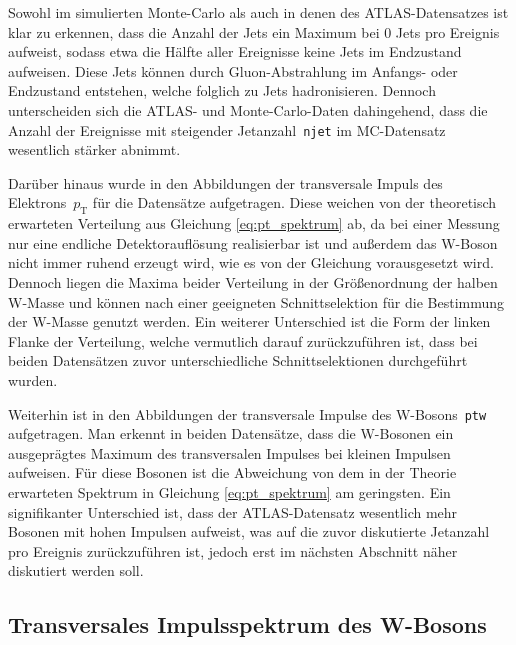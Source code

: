 \documentclass[11pt, a4paper]{article}
\numberwithin{equation}{section}
\begin{document}
Sowohl im simulierten Monte-Carlo als auch in denen des ATLAS-Datensatzes ist klar zu erkennen, dass die Anzahl der Jets ein Maximum bei 0 Jets pro Ereignis aufweist, sodass etwa die Hälfte aller Ereignisse keine Jets im Endzustand aufweisen.
Diese Jets können durch Gluon-Abstrahlung im Anfangs- oder Endzustand entstehen, welche folglich zu Jets hadronisieren.
Dennoch unterscheiden sich die ATLAS- und Monte-Carlo-Daten dahingehend, dass die Anzahl der Ereignisse mit steigender Jetanzahl~\texttt{njet} im MC-Datensatz wesentlich stärker abnimmt.

Darüber hinaus wurde in den Abbildungen der transversale Impuls des Elektrons~$p_\mathrm{T}$ für die Datensätze aufgetragen.
Diese weichen von der theoretisch erwarteten Verteilung aus Gleichung \eqref{eq:pt_spektrum} ab, da bei einer Messung nur eine endliche Detektorauflösung realisierbar ist und außerdem das W-Boson nicht immer ruhend erzeugt wird, wie es von der Gleichung vorausgesetzt wird.
Dennoch liegen die Maxima beider Verteilung in der Größenordnung der halben W-Masse und können nach einer geeigneten Schnittselektion für die Bestimmung der W-Masse genutzt werden.
Ein weiterer Unterschied ist die Form der linken Flanke der Verteilung, welche vermutlich darauf zurückzuführen ist, dass bei beiden Datensätzen zuvor unterschiedliche Schnittselektionen durchgeführt wurden.

Weiterhin ist in den Abbildungen der transversale Impulse des W-Bosons~\texttt{ptw} aufgetragen.
Man erkennt in beiden Datensätze, dass die W-Bosonen ein ausgeprägtes Maximum des transversalen Impulses bei kleinen Impulsen aufweisen.
Für diese Bosonen ist die Abweichung von dem in der Theorie erwarteten Spektrum in Gleichung \eqref{eq:pt_spektrum} am geringsten.
Ein signifikanter Unterschied ist, dass der ATLAS-Datensatz wesentlich mehr Bosonen mit hohen Impulsen aufweist, was auf die zuvor diskutierte Jetanzahl pro Ereignis zurückzuführen ist, jedoch erst im nächsten Abschnitt näher diskutiert werden soll.

\clearpage
\subsection{Transversales Impulsspektrum des W-Bosons}
\label{ssec:ptw_spektrum}
\end{document}
